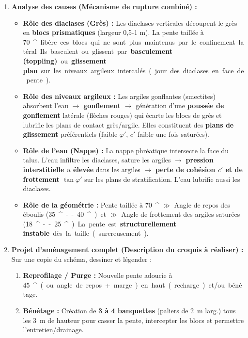 \documentclass[11pt]{article}
\providecommand{\degree}{^{\circ}}
\begin{document}
\begin{exercice}
\begin{enumerate}
\item \textbf{Analyse des causes (Mécanisme de rupture combiné) :}
      \begin{itemize}
      \item \textbf{Rôle des diaclases (Grès) :} Les diaclases verticales découpent le grès en \textbf{blocs prismatiques} (largeur 0,5-1 m). La pente taillée à \SI{70}{\degree} libère ces blocs qui ne sont plus maintenus par le confinement latéral. Ils basculent ou glissent par \textbf{basculement (toppling)} ou \textbf{glissement plan} sur les niveaux argileux intercalés (jour des diaclases en face de pente).
      \item \textbf{Rôle des niveaux argileux :} Les argiles gonflantes (smectites) absorbent l'eau $\rightarrow$ \textbf{gonflement} $\rightarrow$ génération d'une \textbf{poussée de gonflement} latérale (flèches rouges) qui écarte les blocs de grès et lubrifie les plans de contact grès/argile. Elles constituent des \textbf{plans de glissement} préférentiels (faible $\varphi'$, $c'$ faible une fois saturées).
      \item \textbf{Rôle de l'eau (Nappe) :} La nappe phréatique intersecte la face du talus. L'eau infiltre les diaclases, sature les argiles $\rightarrow$ \textbf{pression interstitielle $u$ élevée} dans les argiles $\rightarrow$ \textbf{perte de cohésion $c'$ et de frottement $\tan\varphi'$} sur les plans de stratification. L'eau lubrifie aussi les diaclases.
      \item \textbf{Rôle de la géométrie :} Pente taillée à \SI{70}{\degree} $\gg$ Angle de repos des éboulis (\SI{35}{\degree}--\SI{40}{\degree}) et $\gg$ Angle de frottement des argiles saturées (\SI{18}{\degree}--\SI{25}{\degree}). La pente est \textbf{structurellement instable} dès la taille (surcreusement).
      \end{itemize}
\item \textbf{Projet d'aménagement complet (Description du croquis à réaliser) :}
      Sur une copie du schéma, dessiner et légender :
      \begin{enumerate}
      \item \textbf{Reprofilage / Purge :} Nouvelle pente adoucie à \SI{45}{\degree} (ou angle de repos + marge) en haut (recharge) et/ou bénétage.
      \item \textbf{Bénétage :} Création de \textbf{3 à 4 banquettes} (paliers de \SI{2}{m} larg.) tous les \SI{3}{m} de hauteur pour casser la pente, intercepter les blocs et permettre l'entretien/drainage.

\end{enumerate}
\end{enumerate}
\end{exercice}
\end{document}
